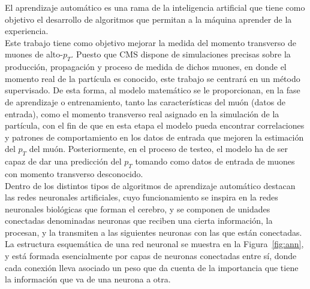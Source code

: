 El aprendizaje autom\'atico es una rama de la inteligencia artificial que tiene como objetivo el desarrollo de algoritmos que permitan a la m\'aquina aprender de la experiencia. \\

Este trabajo tiene como objetivo mejorar la medida del momento transverso de muones de alto-$p_{T}$. Puesto que CMS dispone de simulaciones precisas sobre la producci\'on, propagaci\'on y proceso de medida de dichos muones, en donde el momento real de la part\'icula es conocido, este trabajo se centrar\'a en un m\'etodo supervisado. De esta forma, al modelo matem\'atico se le proporcionan, en la fase de aprendizaje o entrenamiento, tanto las caracter\'isticas del mu\'on (datos de entrada), como el momento transverso real asignado en la simulaci\'on de la part\'icula, con el fin de que en esta etapa el modelo pueda encontrar correlaciones y patrones de comportamiento en los datos de entrada que mejoren la estimaci\'on del $p_{T}$ del mu\'on. Posteriormente, en el proceso de testeo, el modelo ha de ser capaz de dar una predicci\'on del $p_{T}$ tomando como datos de entrada de muones con momento transverso desconocido. \\

Dentro de los distintos tipos de algoritmos de aprendizaje autom\'atico destacan las redes neuronales artificiales, cuyo funcionamiento se inspira en la redes neuronales biol\'ogicas que forman el cerebro, y se componen de unidades conectadas denominadas neuronas que reciben una cierta informaci\'on, la procesan, y la transmiten a las siguientes neuronas con las que est\'an conectadas. La estructura esquem\'atica de una red neuronal se muestra en la Figura~\ref{fig:ann}, y est\'a formada esencialmente por capas de neuronas conectadas entre s\'i, donde cada conexi\'on lleva asociado un peso que da cuenta de la importancia que tiene la informaci\'on que va de una neurona a otra. \\

